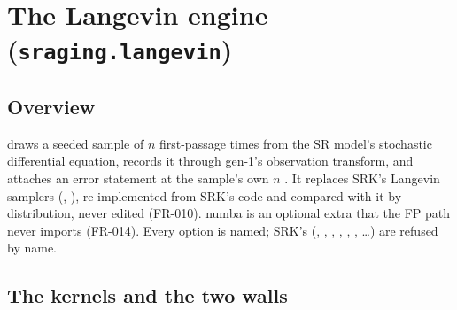 \section{The Langevin engine (\texttt{sraging.langevin})}\label{sec:lgv}

\subsection{Overview}\label{sec:lgv-overview}

 draws a seeded sample of $n$ first-passage times from the SR model's stochastic
differential equation, records it through gen-1's observation transform, and attaches an error statement at the
sample's own $n$ . It replaces SRK's Langevin samplers (,
), re-implemented from SRK's code and compared with it by distribution, never edited (FR-010). numba is an
optional extra that the FP path never imports (FR-014). Every option is named; SRK's (,
, , , , , \ldots) are refused by
name.

\subsection{The kernels and the two walls}\label{sec:lgv-kernels}

